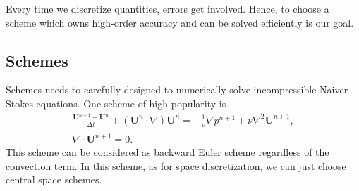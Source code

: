 \documentclass[english, nochinese]{pkupaper}
\begin{document}
Every time we discretize quantities, errors get involved. Hence, to choose a scheme which owns high-order accuracy and can be solved efficiently is our goal.

\subsection{Schemes}\label{SSec:Schemes}



Schemes needs to carefully designed to numerically solve incompressible Naiver--Stokes equations. One scheme of high popularity is
\begin{equation}
\begin{gathered}
\frac{\mathbf{U}^{n+1} - \mathbf{U}^n}{\Delta t} + (\mathbf{U}^n\cdot\nabla)\mathbf{U}^n = - \frac{1}{\rho} \nabla p^{n+1} + \nu \nabla^2 \mathbf{U}^{n+1}, \\
\nabla\cdot \mathbf{U}^{n+1} = 0.
\end{gathered}
\end{equation}
This scheme can be considered as backward Euler scheme regardless of the convection term. In this scheme, as for space discretization, we can just choose central space schemes.


\end{document}

